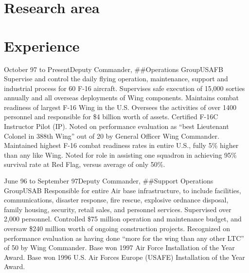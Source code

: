 \documentclass[10pt,letterpaper,lmodern]{mtvita}
\begin{document}
\maketitle
\thispagestyle{empty} %

\section{Research area}
\lipsum[1-2]

\section{Experience}

\begin{job}{October 97 to Present}{Deputy Commander, \#\#Operations Group}{USAFB}{%
Supervise and control the daily flying operation, maintenance, support and industrial process for 60 F-16 aircraft. Supervises safe execution of 15,000 sorties annually and all overseas deployments of Wing components. Maintains combat readiness of largest F-16 Wing in the U.S. Oversees the activities of over 1400 personnel and responsible for \$4 billion worth of assets. Certified F-16C Instructor Pilot (IP).
}
\accomplishment Noted on performance evaluation as ``best Lieutenant Colonel in 388th Wing'' out of 20 by General Officer Wing Commander.
\accomplishment Maintained highest F-16 combat readiness rates in entire U.S., fully 5\% higher than any like Wing.
\accomplishment Noted for role in assisting one squadron in achieving 95\% survival rate at Red Flag, versus average of only 50\%.
\end{job}

\begin{job}{June 96 to September 97}{Deputy Commander, \#\#Support Operations Group}{USAB}{%
Responsible for entire Air base infrastructure, to include facilities, communications, disaster response, fire rescue, explosive ordnance disposal, family housing,
security, retail sales, and personnel services. Supervised over 2,000 personnel. Controlled \$75 million operation and maintenance
budget, and oversaw \$240 million worth of ongoing construction projects.
}
\accomplishment Recognized on performance evaluation as having done ``more for the wing than any other LTC'' of 50 by Wing Commander.
\accomplishment Base won 1997 Air Force Installation of the Year Award.
\accomplishment Base won 1996 U.S. Air Forces Europe (USAFE) Installation of the Year Award.
\end{job}
\end{document}
